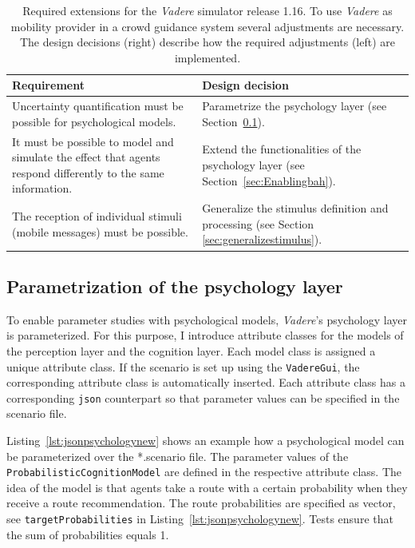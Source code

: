 \begin{table}[hbt!]
\begin{tabular}{|p{8cm}|p{6cm}|}
\hline
\textbf{Requirement} & \textbf{Design decision}  \\
\hline 
 Uncertainty quantification must be possible for psychological models.
  & Parametrize the psychology layer (see Section~\ref{sec:Parametrizationofthepsychologylayer}). \\ \hline 
 It must be possible to model and simulate the effect that agents respond differently to the same information. & Extend the functionalities of the psychology layer (see Section~\ref{sec:Enablingbah}).\\ \hline 
 The reception of individual stimuli (mobile messages) must be possible. & Generalize the stimulus definition and processing (see Section \ref{sec:generalizestimulus}). \\
 \hline 
\end{tabular} 
\caption[Requirements on the extension of the \textit{Vadere} simulator.]{Required extensions for the \textit{Vadere} simulator release 1.16. To use \textit{Vadere} as mobility provider in a crowd guidance system several adjustments are necessary. The design decisions (right) describe how the required adjustments (left) are implemented. }
\label{tab:requirementsvadere}
\end{table}



\subsection{Parametrization of the psychology layer}
\label{sec:Parametrizationofthepsychologylayer}

To enable parameter studies with psychological models, \textit{Vadere}'s psychology layer is parameterized. For this purpose, I introduce attribute classes for the models of the perception layer and the cognition layer. Each model class is assigned a unique attribute class. If the scenario is set up using the \lstinline{VadereGui}, the corresponding attribute class is automatically inserted. Each attribute class has a corresponding \lstinline{json} counterpart so that parameter values can be specified in the scenario file. 


Listing~\ref{lst:jsonpsychologynew} shows an example how a psychological model can be parameterized over the *.scenario file. The parameter values of the \lstinline{ProbabilisticCognitionModel} are defined in the respective attribute class. The idea of the model is that agents take a route with a certain probability when they receive a route recommendation. The route probabilities are specified as vector, see \lstinline{targetProbabilities} in Listing~\ref{lst:jsonpsychologynew}.  Tests ensure that the sum of probabilities equals 1. 




